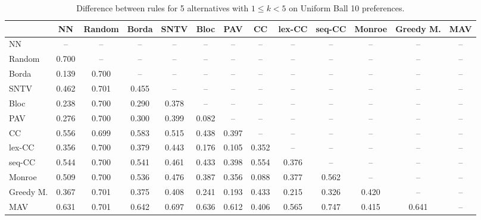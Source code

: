 
\begin{table*}[h!]
\centering
\begin{tabular}{lcccccccccccc}
\toprule
 & NN & Random & Borda & SNTV & Bloc & PAV & CC & lex-CC & seq-CC & Monroe & Greedy M. & MAV \\
\midrule
NN & -- & -- & -- & -- & -- & -- & -- & -- & -- & -- & -- & -- \\
Random & 0.700 & -- & -- & -- & -- & -- & -- & -- & -- & -- & -- & -- \\
Borda & 0.139 & 0.700 & -- & -- & -- & -- & -- & -- & -- & -- & -- & -- \\
SNTV & 0.462 & 0.701 & 0.455 & -- & -- & -- & -- & -- & -- & -- & -- & -- \\
Bloc & 0.238 & 0.700 & 0.290 & 0.378 & -- & -- & -- & -- & -- & -- & -- & -- \\
PAV & 0.276 & 0.700 & 0.300 & 0.399 & 0.082 & -- & -- & -- & -- & -- & -- & -- \\
CC & 0.556 & 0.699 & 0.583 & 0.515 & 0.438 & 0.397 & -- & -- & -- & -- & -- & -- \\
lex-CC & 0.356 & 0.700 & 0.379 & 0.443 & 0.176 & 0.105 & 0.352 & -- & -- & -- & -- & -- \\
seq-CC & 0.544 & 0.700 & 0.541 & 0.461 & 0.433 & 0.398 & 0.554 & 0.376 & -- & -- & -- & -- \\
Monroe & 0.509 & 0.700 & 0.536 & 0.476 & 0.387 & 0.356 & 0.088 & 0.377 & 0.562 & -- & -- & -- \\
Greedy M. & 0.367 & 0.701 & 0.375 & 0.408 & 0.241 & 0.193 & 0.433 & 0.215 & 0.326 & 0.420 & -- & -- \\
MAV & 0.631 & 0.701 & 0.642 & 0.697 & 0.636 & 0.612 & 0.406 & 0.565 & 0.747 & 0.415 & 0.641 & -- \\
\bottomrule
\end{tabular}

\caption{Difference between rules for 5 alternatives with $1 \leq k < 5$ on Uniform Ball 10 preferences.}
\end{table*}
